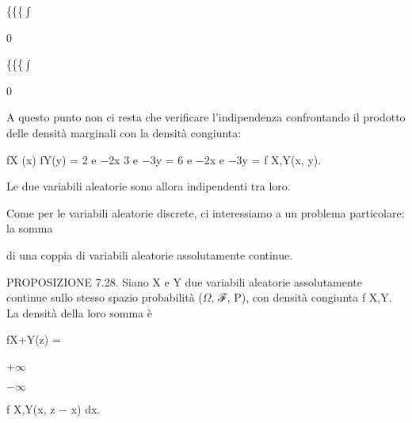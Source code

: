 \documentclass[a4paper,portrait,12pt]{article}
\begin{document}
\{\{\{ ∫


0





\{\{\{ ∫


0





\begin{flushleft}
A questo punto non ci resta che verificare l'indipendenza confrontando il prodotto delle densit\`{a} marginali con la densit\`{a} congiunta:
\end{flushleft}


\begin{flushleft}
fX (x) fY(y) = 2 e $-$2x 3 e $-$3y = 6 e $-$2x e $-$3y = f X,Y(x, y).
\end{flushleft}


\begin{flushleft}
Le due variabili aleatorie sono allora indipendenti tra loro.
\end{flushleft}


\begin{flushleft}
Come per le variabili aleatorie discrete, ci interessiamo a un problema particolare: la somma
\end{flushleft}


\begin{flushleft}
di una coppia di variabili aleatorie assolutamente continue.
\end{flushleft}


\begin{flushleft}
PROPOSIZIONE 7.28. Siano X e Y due variabili aleatorie assolutamente continue sullo stesso spazio probabilit\`{a} ($\Omega$, ℱ, P), con densit\`{a} congiunta f X,Y. La densit\`{a} della loro somma \`{e}
\end{flushleft}


\begin{flushleft}
fX+Y(z) =
\end{flushleft}





+$\infty$


$-$$\infty$





\begin{flushleft}
f X,Y(x, z $-$ x) dx.
\end{flushleft}
\end{document}

